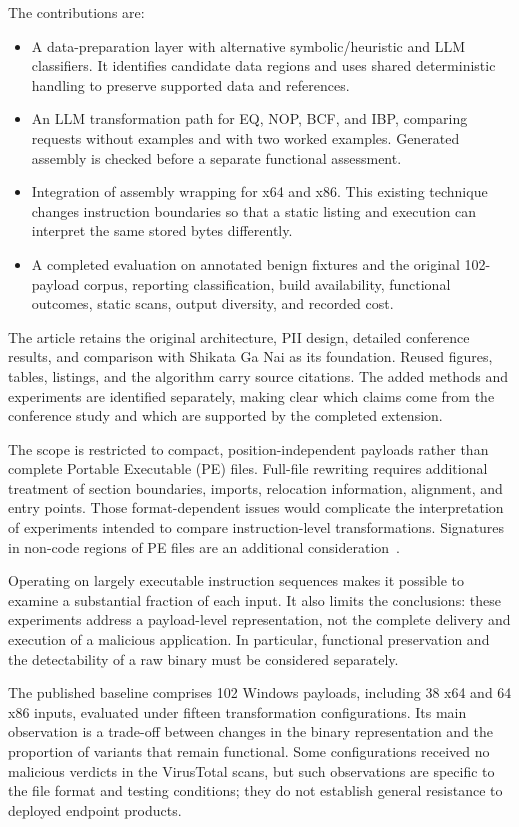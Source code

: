 \documentclass[runningheads]{llncs}
\begin{document}
The contributions are:
\begin{itemize}
\item A data-preparation layer with alternative symbolic/heuristic and
LLM classifiers. It identifies candidate data regions and uses shared
deterministic handling to preserve supported data and references.
\item An LLM transformation path for EQ, NOP, BCF, and IBP, comparing
requests without examples and with two worked examples. Generated
assembly is checked before a separate functional assessment.
\item Integration of assembly wrapping for x64 and x86. This existing
technique changes instruction boundaries so that a static listing and
execution can interpret the same stored bytes differently.
\item A completed evaluation on annotated benign fixtures and the
original 102-payload corpus, reporting classification, build availability,
functional outcomes, static scans, output diversity, and recorded cost.
\end{itemize}

The article retains the original architecture, PII design, detailed
conference results, and comparison with Shikata Ga Nai as its foundation.
Reused figures, tables, listings, and the algorithm carry source citations.
The added methods and experiments are identified separately, making clear
which claims come from the conference study and which are supported by
the completed extension.

The scope is restricted to compact, position-independent payloads rather than complete Portable Executable (PE) files. Full-file rewriting requires additional treatment of section boundaries, imports, relocation information, alignment, and entry points. Those format-dependent issues would complicate the interpretation of experiments intended to compare instruction-level transformations. Signatures in non-code regions of PE files are an additional consideration~\cite{sigdetPEnoncode}.

Operating on largely executable instruction sequences makes it possible to examine a substantial fraction of each input. It also limits the conclusions: these experiments address a payload-level representation, not the complete delivery and execution of a malicious application. In particular, functional preservation and the detectability of a raw binary must be considered separately.

The published baseline comprises 102 Windows payloads, including 38 x64 and 64 x86 inputs, evaluated under fifteen transformation configurations. Its main observation is a trade-off between changes in the binary representation and the proportion of variants that remain functional. Some configurations received no malicious verdicts in the VirusTotal scans, but such observations are specific to the file format and testing conditions; they do not establish general resistance to deployed endpoint products.
\end{document}
